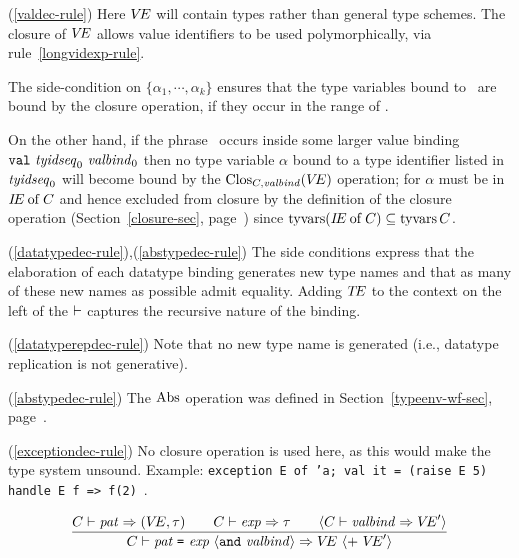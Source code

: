 \begin{description}
\item{(\ref{valdec-rule})}
Here $\mbox{$V\!E$}$ will contain types rather than general
type schemes. The closure of $\mbox{$V\!E$}$  allows value identifiers to
be used polymorphically, via 
rule~\ref{longvidexp-rule}. 

The side-condition on $\{\alpha_1,\cdots,\alpha_k\}$
ensures that the type variables bound to \tyidseq\
are bound by the closure operation, if they occur in the range of \VE.

On the other hand, if the phrase \valdec\ occurs inside some larger
value binding ${\tt val}\ {\it tyidseq}_0\ {\it valbind}_0$
then no type variable $\alpha$ bound to a type identifier
listed in ${\it tyidseq}_0$ will become bound by the 
${\rm Clos}_{C,{\it valbind}}(\mbox{$V\!E$})$ operation; for 
$\alpha$ must be in $\mbox{$I\!E$} \mathbin{\rm of} C$ and 
hence excluded from closure by the definition of the closure operation 
(Section~\ref{closure-sec}, page~\pageref{clos-def-lab})
since $\mathop{\rm tyvars}\nolimits(\mbox{$I\!E$} \mathbin{\rm of} C)\subseteq\mathop{\rm tyvars}\nolimits C$.

\item{(\ref{datatypedec-rule}),(\ref{abstypedec-rule})}
The side conditions
express that the elaboration of each datatype binding
generates new type names and that as many of these new names
as possible admit equality.  Adding $\mbox{$T\!E$}$ to the context on the left
of the $\vdash$ captures the recursive nature of the binding.

\item{(\ref{datatyperepdec-rule})}
Note that no new type name is generated (i.e., datatype replication is not generative). 
\item{(\ref{abstypedec-rule})}
The $\mathop{\rm Abs}\nolimits$ operation was defined in Section~\ref{typeenv-wf-sec}, page~\pageref{abs-lab}.
\item{(\ref{exceptiondec-rule})}
No closure operation is used here, as this would make the type system unsound.
Example: {\tt exception E of 'a; val it = (raise E 5) handle E f => f(2)}~.
\end{description}

%
\begin{equation}	%
\label{valbind-rule}
\frac{\C\ts\pat\ra(\VE,\tau)\qquad\C\ts\exp\ra\tau\qquad
      \langle\C\ts\valbind\ra\VE'\rangle }
     {\C\ts\longvalbind\ra\VE\ \langle +\ \VE'\rangle}\index{29.1}
\end{equation}

